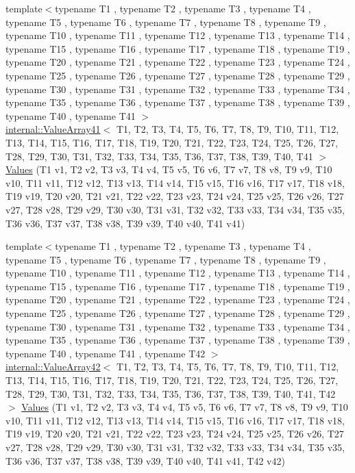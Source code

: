 \begin{DoxyCompactItemize}
\item 
{\footnotesize template$<$typename T1 , typename T2 , typename T3 , typename T4 , typename T5 , typename T6 , typename T7 , typename T8 , typename T9 , typename T10 , typename T11 , typename T12 , typename T13 , typename T14 , typename T15 , typename T16 , typename T17 , typename T18 , typename T19 , typename T20 , typename T21 , typename T22 , typename T23 , typename T24 , typename T25 , typename T26 , typename T27 , typename T28 , typename T29 , typename T30 , typename T31 , typename T32 , typename T33 , typename T34 , typename T35 , typename T36 , typename T37 , typename T38 , typename T39 , typename T40 , typename T41 $>$ }\\\mbox{\hyperlink{classtesting_1_1internal_1_1ValueArray41}{internal\+::\+Value\+Array41}}$<$ T1, T2, T3, T4, T5, T6, T7, T8, T9, T10, T11, T12, T13, T14, T15, T16, T17, T18, T19, T20, T21, T22, T23, T24, T25, T26, T27, T28, T29, T30, T31, T32, T33, T34, T35, T36, T37, T38, T39, T40, T41 $>$ \mbox{\hyperlink{namespacetesting_a51df725741cfcc9539c48885fc2728b0}{Values}} (T1 v1, T2 v2, T3 v3, T4 v4, T5 v5, T6 v6, T7 v7, T8 v8, T9 v9, T10 v10, T11 v11, T12 v12, T13 v13, T14 v14, T15 v15, T16 v16, T17 v17, T18 v18, T19 v19, T20 v20, T21 v21, T22 v22, T23 v23, T24 v24, T25 v25, T26 v26, T27 v27, T28 v28, T29 v29, T30 v30, T31 v31, T32 v32, T33 v33, T34 v34, T35 v35, T36 v36, T37 v37, T38 v38, T39 v39, T40 v40, T41 v41)
\item 
{\footnotesize template$<$typename T1 , typename T2 , typename T3 , typename T4 , typename T5 , typename T6 , typename T7 , typename T8 , typename T9 , typename T10 , typename T11 , typename T12 , typename T13 , typename T14 , typename T15 , typename T16 , typename T17 , typename T18 , typename T19 , typename T20 , typename T21 , typename T22 , typename T23 , typename T24 , typename T25 , typename T26 , typename T27 , typename T28 , typename T29 , typename T30 , typename T31 , typename T32 , typename T33 , typename T34 , typename T35 , typename T36 , typename T37 , typename T38 , typename T39 , typename T40 , typename T41 , typename T42 $>$ }\\\mbox{\hyperlink{classtesting_1_1internal_1_1ValueArray42}{internal\+::\+Value\+Array42}}$<$ T1, T2, T3, T4, T5, T6, T7, T8, T9, T10, T11, T12, T13, T14, T15, T16, T17, T18, T19, T20, T21, T22, T23, T24, T25, T26, T27, T28, T29, T30, T31, T32, T33, T34, T35, T36, T37, T38, T39, T40, T41, T42 $>$ \mbox{\hyperlink{namespacetesting_a0951fc3989cde27914791eb120f8f01c}{Values}} (T1 v1, T2 v2, T3 v3, T4 v4, T5 v5, T6 v6, T7 v7, T8 v8, T9 v9, T10 v10, T11 v11, T12 v12, T13 v13, T14 v14, T15 v15, T16 v16, T17 v17, T18 v18, T19 v19, T20 v20, T21 v21, T22 v22, T23 v23, T24 v24, T25 v25, T26 v26, T27 v27, T28 v28, T29 v29, T30 v30, T31 v31, T32 v32, T33 v33, T34 v34, T35 v35, T36 v36, T37 v37, T38 v38, T39 v39, T40 v40, T41 v41, T42 v42)

\end{DoxyCompactItemize}
